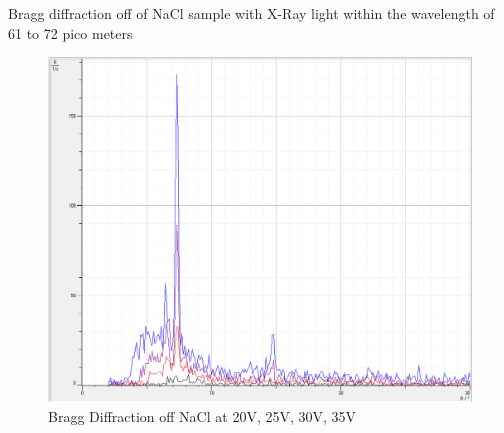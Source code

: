 \documentclass{amsart}
\begin{document}
{\centering Bragg diffraction off of NaCl sample with X-Ray light within the wavelength of 61 to 72 pico meters}

\begin{figure}[H]
        \centering
        \includegraphics[width=\textwidth]{NaCl_all.PNG}
        \caption{Bragg Diffraction off NaCl at 20V, 25V, 30V, 35V}
\end{figure}
\end{document}

